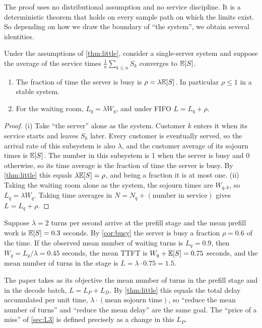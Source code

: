 The proof uses no distributional assumption and no service discipline. It is a
deterministic theorem that holds on every sample path on which the limits exist. So
depending on how we draw the boundary of ``the system'', we obtain several identities.

\begin{corollary}\label{cor:busy}
Under the assumptions of \cref{thm:little}, consider a single-server system and
suppose the average of the service times $\frac1n\sum_{k\le n}S_k$ converges to
$\mathbb{E}[S]$.
\begin{enumerate}[label=(\roman*)]
\item The fraction of time the server is busy is $\rho=\lambda\mathbb{E}[S]$. In particular
  $\rho\le1$ in a stable system.
\item For the waiting room, $L_q=\lambda W_q$, and under FIFO $L=L_q+\rho$.
\end{enumerate}
\end{corollary}

\begin{proof}
(i) Take ``the server'' alone as the system. Customer $k$ enters it when its service
starts and leaves $S_k$ later. Every customer is eventually served, so the arrival
rate of this subsystem is also $\lambda$, and the customer average of its sojourn times
is $\mathbb{E}[S]$. The number in this subsystem is 1 when the server is busy and 0 otherwise,
so its time average is the fraction of time the server is busy. By \cref{thm:little}
this equals $\lambda\mathbb{E}[S]=\rho$, and being a fraction it is at most one.
(ii) Taking the waiting room alone as the system, the sojourn times are $W_{q,k}$, so
$L_q=\lambda W_q$. Taking time averages in $N=N_q+(\text{number in service})$ gives
$L=L_q+\rho$.
\end{proof}

\begin{example}\label{L1:ex:little}
Suppose $\lambda=2$ turns per second arrive at the prefill stage and the mean prefill
work is $\mathbb{E}[S]=0.3$ seconds. By \cref{cor:busy} the server is busy a fraction
$\rho=0.6$ of the time. If the observed mean number of waiting turns is $L_q=0.9$,
then $W_q=L_q/\lambda=0.45$ seconds, the mean TTFT is $W_q+\mathbb{E}[S]=0.75$ seconds, and the
mean number of turns in the stage is $L=\lambda\cdot0.75=1.5$.
\end{example}

The paper takes as its objective the mean number of turns in the prefill stage and in
the decode batch, $L=L_P+L_D$. By \cref{thm:little} this equals the total delay
accumulated per unit time, $\lambda\cdot(\text{mean sojourn time})$, so ``reduce the
mean number of turns'' and ``reduce the mean delay'' are the same goal. The ``price of
a miss'' of \cref{sec:L3} is defined precisely as a change in this $L_P$.

